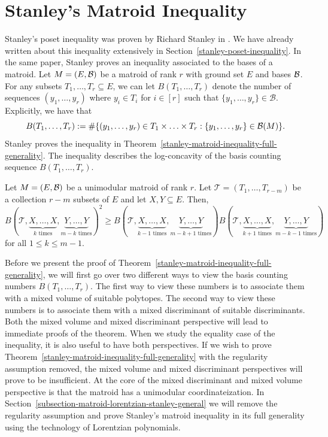 \documentclass{puthesis-UG}
\begin{document}
\section{Stanley's Matroid Inequality} \label{sec:stanley-matroid-inequality}

Stanley's poset inequality was proven by Richard Stanley in \cite{STANLEY}. We have already written about this inequality extensively in Section~\ref{stanley-poset-inequality}. In the same paper, Stanley proves an inequality associated to the bases of a matroid. Let $M = (E, \mathcal{B})$ be a matroid of rank $r$ with ground set $E$ and bases $\mathcal{B}$. For any subsets $T_1, \ldots, T_r \subseteq E$, we can let $B(T_1, \ldots, T_r)$ denote the number of sequences $(y_1, \ldots, y_r)$ where $y_i \in T_i$ for $i \in [r]$ such that $\{y_1, \ldots, y_r\} \in \mathcal{B}$. Explicitly, we have that 
\[
	B(T_1, \ldots, T_r) := \# \{ (y_1, \ldots, y_r) \in T_1 \times \ldots \times T_r : \{y_1, \ldots, y_r\} \in \mathcal{B}(M) \}.
\]
Stanley proves the inequality in Theorem~\ref{stanley-matroid-inequality-full-generality}. The inequality describes the log-concavity of the basis counting sequence $B(T_1, \ldots, T_r)$. 

\begin{thm} \label{stanley-matroid-inequality-full-generality}
	Let $M = (E, \mathcal{B})$ be a unimodular matroid of rank $r$. Let $\mathcal{T} = (T_1, \ldots, T_{r-m})$ be a collection $r-m$ subsets of $E$ and let $X, Y \subseteq E$. Then, 
	\[
		B(\mathcal{T}, \underbrace{X, \ldots, X}_{k \text{ times}}, \underbrace{Y, \ldots, Y}_{m-k \text{ times}})^2 \geq B(\mathcal{T}, \underbrace{X, \ldots, X}_{k-1 \text{ times}}, \underbrace{Y, \ldots, Y}_{m-k+1 \text{ times}}) B(\mathcal{T}, \underbrace{X, \ldots, X}_{k+1 \text{ times}}, \underbrace{Y, \ldots, Y}_{m-k-1 \text{ times}})
	\]
	for all $1 \leq k \leq m-1$. 
\end{thm}

Before we present the proof of Theorem~\ref{stanley-matroid-inequality-full-generality}, we will first go over two different ways to view the basis counting numbers $B(T_1, \ldots, T_r)$. The first way to view these numbers is to associate them with a mixed volume of suitable polytopes. The second way to view these numbers is to associate them with a mixed discriminant of suitable discriminants. Both the mixed volume and mixed discriminant perspective will lead to immediate proofs of the theorem. When we study the equality case of the inequality, it is also useful to have both perspectives. If we wish to prove Theorem~\ref{stanley-matroid-inequality-full-generality} with the regularity assumption removed, the mixed volume and mixed discriminant perspectives will prove to be insufficient. At the core of the mixed discriminant and mixed volume perspective is that the matroid has a unimodular coordinateization. In Section~\ref{subsection-matroid-lorentzian-stanley-general} we will remove the regularity assumption and prove Stanley's matroid inequality in its full generality using the technology of Lorentzian polynomials.
\end{document}
